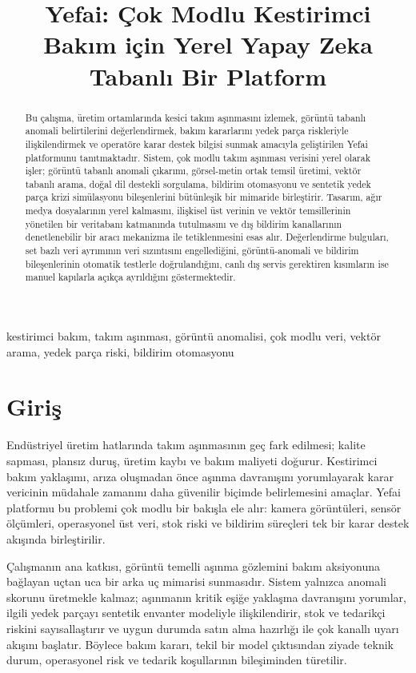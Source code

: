 \documentclass[conference]{IEEEtran}
\begin{document}
\title{Yefai: Çok Modlu Kestirimci Bakım için Yerel Yapay Zeka Tabanlı Bir Platform}

\maketitle

\begin{abstract}
Bu çalışma, üretim ortamlarında kesici takım aşınmasını izlemek, görüntü tabanlı anomali belirtilerini değerlendirmek, bakım kararlarını yedek parça riskleriyle ilişkilendirmek ve operatöre karar destek bilgisi sunmak amacıyla geliştirilen Yefai platformunu tanıtmaktadır. Sistem, çok modlu takım aşınması verisini yerel olarak işler; görüntü tabanlı anomali çıkarımı, görsel-metin ortak temsil üretimi, vektör tabanlı arama, doğal dil destekli sorgulama, bildirim otomasyonu ve sentetik yedek parça krizi simülasyonu bileşenlerini bütünleşik bir mimaride birleştirir. Tasarım, ağır medya dosyalarının yerel kalmasını, ilişkisel üst verinin ve vektör temsillerinin yönetilen bir veritabanı katmanında tutulmasını ve dış bildirim kanallarının denetlenebilir bir aracı mekanizma ile tetiklenmesini esas alır. Değerlendirme bulguları, set bazlı veri ayrımının veri sızıntısını engellediğini, görüntü-anomali ve bildirim bileşenlerinin otomatik testlerle doğrulandığını, canlı dış servis gerektiren kısımların ise manuel kapılarla açıkça ayrıldığını göstermektedir.
\end{abstract}

\begin{IEEEkeywords}
kestirimci bakım, takım aşınması, görüntü anomalisi, çok modlu veri, vektör arama, yedek parça riski, bildirim otomasyonu
\end{IEEEkeywords}

\section{Giriş}
Endüstriyel üretim hatlarında takım aşınmasının geç fark edilmesi; kalite sapması, plansız duruş, üretim kaybı ve bakım maliyeti doğurur. Kestirimci bakım yaklaşımı, arıza oluşmadan önce aşınma davranışını yorumlayarak karar vericinin müdahale zamanını daha güvenilir biçimde belirlemesini amaçlar. Yefai platformu bu problemi çok modlu bir bakışla ele alır: kamera görüntüleri, sensör ölçümleri, operasyonel üst veri, stok riski ve bildirim süreçleri tek bir karar destek akışında birleştirilir.

Çalışmanın ana katkısı, görüntü temelli aşınma gözlemini bakım aksiyonuna bağlayan uçtan uca bir arka uç mimarisi sunmasıdır. Sistem yalnızca anomali skorunu üretmekle kalmaz; aşınmanın kritik eşiğe yaklaşma davranışını yorumlar, ilgili yedek parçayı sentetik envanter modeliyle ilişkilendirir, stok ve tedarikçi riskini sayısallaştırır ve uygun durumda satın alma hazırlığı ile çok kanallı uyarı akışını başlatır. Böylece bakım kararı, tekil bir model çıktısından ziyade teknik durum, operasyonel risk ve tedarik koşullarının bileşiminden türetilir.
\end{document}
